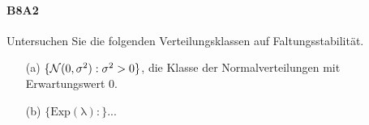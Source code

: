 \documentclass{article}
\begin{document}
\paragraph{B8A2}
Untersuchen Sie die folgenden Verteilungsklassen auf Faltungsstabilität.
\begin{enumerate}
\item[(a)] $\{{\cal N}(0,\sigma^2):\sigma^2>0\}$, die Klasse der Normalverteilungen mit Erwartungswert 0.
\end{enumerate}
\begin{enumerate}
\item[(b)] $\{\operatorname{Exp(\lambda):}\}$...
\end{enumerate}
\newpage



\end{document}
